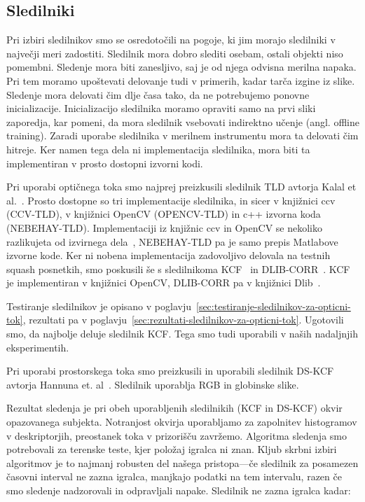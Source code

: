\subsection{Sledilniki}
Pri izbiri sledilnikov smo se osredotočili na pogoje, ki jim morajo sledilniki v največji meri zadostiti. Sledilnik mora dobro slediti osebam, ostali objekti niso pomembni. Sledenje mora biti zanesljivo, saj je od njega odvisna merilna napaka. Pri tem moramo upoštevati delovanje tudi v primerih, kadar tarča izgine iz slike. Sledenje mora delovati čim dlje časa tako, da ne potrebujemo ponovne inicializacije. Inicializacijo sledilnika moramo opraviti samo na prvi sliki zaporedja, kar pomeni, da mora sledilnik vsebovati indirektno učenje (angl. offline training). Zaradi uporabe sledilnika v merilnem instrumentu mora ta delovati čim hitreje. Ker namen tega dela ni implementacija sledilnika, mora biti ta implementiran v prosto dostopni izvorni kodi. 

Pri uporabi optičnega toka smo najprej preizkusili sledilnik TLD avtorja Kalal et al.~\cite{kalal2012tracking}. Prosto dostopne so tri implementacije sledilnika, in sicer v knjižnici ccv (CCV-TLD), v knjižnici OpenCV (OPENCV-TLD) in c++ izvorna koda (NEBEHAY-TLD). Implementaciji iz knjižnic ccv in OpenCV se nekoliko razlikujeta od izvirnega dela~\cite{kalal2012tracking}, NEBEHAY-TLD pa je samo prepis Matlabove izvorne kode.  Ker ni nobena implementacija zadovoljivo delovala na testnih squash posnetkih, smo poskusili še s sledilnikoma KCF~\cite{danelljan2014adaptive} in DLIB-CORR~\cite{danelljan2014accurate}. KCF je implementiran v knjižnici OpenCV, DLIB-CORR pa v knjižnici Dlib~\cite{king2009dlib}.

Testiranje sledilnikov je opisano v poglavju~\ref{sec:testiranje-sledilnikov-za-opticni-tok}, rezultati pa v poglavju~\ref{sec:rezultati-sledilnikov-za-opticni-tok}. Ugotovili smo, da najbolje deluje sledilnik KCF. Tega smo tudi uporabili v naših nadaljnjih eksperimentih.

Pri uporabi prostorskega toka smo preizkusili in uporabili sledilnik DS-KCF avtorja Hannuna et. al~\cite{hannuna2016ds}. Sledilnik uporablja RGB in globinske slike.


Rezultat sledenja je pri obeh uporabljenih sledilnikih (KCF in DS-KCF) okvir opazovanega subjekta. Notranjost okvirja uporabljamo za zapolnitev histogramov v deskriptorjih, preostanek toka v prizorišču zavržemo. Algoritma sledenja smo potrebovali za terenske teste, kjer položaj igralca ni znan. Kljub skrbni izbiri algoritmov je to najmanj robusten del našega pristopa---če sledilnik za posamezen časovni interval ne zazna igralca, manjkajo podatki na tem intervalu, razen če smo sledenje nadzorovali in odpravljali napake. Sledilnik ne zazna igralca kadar:

